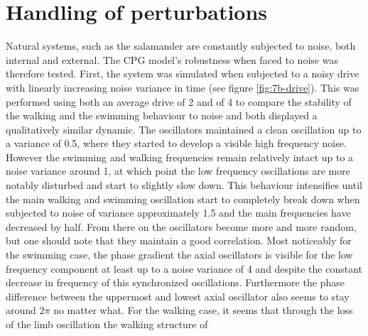 \documentclass[a4paper]{scrartcl}
\begin{document}
\section{Handling of perturbations}
Natural systems, such as the salamander are constantly subjected to noise, both internal and external. The CPG model's robustness when faced to noise was therefore tested. First, the system was simulated when subjected to a noisy drive with linearly increasing noise variance in time (see figure \ref{fig:7b-drive}). This was performed using both an average drive of 2 and of 4 to compare the stability of the walking and the swimming behaviour to noise and both displayed a qualitatively similar dynamic. The oscillators maintained a clean oscillation up to a variance of 0.5, where they started to develop a visible high frequency noise. However the swimming and walking frequencies remain relatively intact up to a noise variance around 1, at which point the low frequency oscillations are more notably disturbed and start to slightly slow down. This behaviour intensifies until the main walking and swimming oscillation start to completely break down when subjected to noise of variance approximately 1.5 and the main frequencies have decreased by half. From there on the oscillators become more and more random, but one should note that they maintain a good correlation. Most noticeably for the swimming case, the phase gradient the axial oscillators is visible for the low frequency component at least up to a noise variance of 4 and despite the constant decrease in frequency of this synchronized oscillations. Furthermore the phase difference between the uppermost and lowest axial oscillator also seems to stay around $2\pi$ no matter what. For the walking case, it 
seems that through the loss of the limb oscillation the walking structure of 
\end{document}
